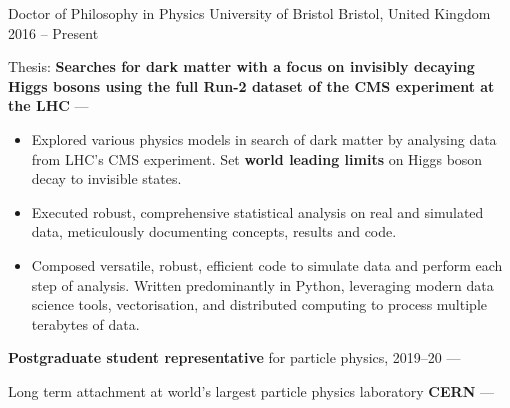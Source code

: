 
\newcommand{\vpaddingEduNorm}{\vspace{1mm}} %
\newcommand{\vpaddingEduSubpoint}{\vspace{0.75mm}} %


\begin{cventries}
    \cventry
        {Doctor of Philosophy in Physics} %
        {University of Bristol} %
        {Bristol, United Kingdom} %
        {2016 -- Present} %
        {
        \begin{cvitems} %
            \item {Thesis: \textbf{Searches for dark matter with a focus on invisibly decaying Higgs bosons using the full Run-2 dataset of the CMS experiment at the LHC} --- }
            \vpaddingEduSubpoint
            \begin{itemize}
                \item[\bullet]{Explored various physics models in search of dark matter by analysing data from LHC's CMS experiment. Set \textbf{world leading limits} on Higgs boson decay to invisible states.}
                \vpaddingEduSubpoint
                \item[\bullet]{Executed robust, comprehensive statistical analysis on real and simulated data, meticulously documenting concepts, results and code.}
                \vpaddingEduSubpoint
                \item[\bullet]{Composed versatile, robust, efficient code to simulate data and perform each step of analysis. Written predominantly in Python, leveraging modern data science tools, vectorisation, and distributed computing to process multiple terabytes of data.}
            \end{itemize}
            \vpaddingEduNorm
            \item {\textbf{Postgraduate student representative} for particle physics, 2019--20 --- }
            \vpaddingEduNorm
            \item {Long term attachment at world's largest particle physics laboratory \textbf{CERN} --- }

\end{cvitems}}
\end{cventries}
